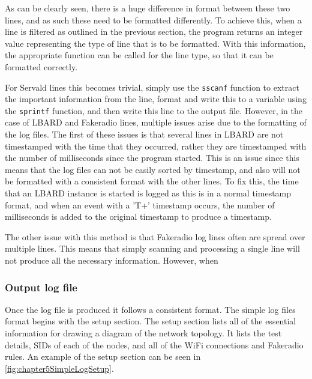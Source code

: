 As can be clearly seen, there is a huge difference in format between these two lines, and as such these need to be formatted differently.
To achieve this, when a line is filtered as outlined in the previous section, the program returns an integer value representing the type of line that is to be formatted.
With this information, the appropriate function can be called for the line type, so that it can be formatted correctly.

For Servald lines this becomes trivial, simply use the \verb|sscanf| function to extract the important information from the line, format and write this to a variable using the \verb|sprintf| function, and then write this line to the output file. 
However, in the case of LBARD and Fakeradio lines, multiple issues arise due to the formatting of the log files.
The first of these issues is that several lines in LBARD are not timestamped with the time that they occurred, rather they are timestamped with the number of milliseconds since the program started.
This is an issue since this means that the log files can not be easily sorted by timestamp, and also will not be formatted with a consistent format with the other lines.
To fix this, the time that an LBARD instance is started is logged as this is in a normal timestamp format, and when an event with a 'T+' timestamp occurs, the number of milliseconds is added to the original timestamp to produce a timestamp. 

The other issue with this method is that Fakeradio log lines often are spread over multiple lines.
This means that simply scanning and processing a single line will not produce all the necessary information.
However, when 

\subsubsection{Output log file}

Once the log file is produced it follows a consistent format.
The simple log files format begins with the setup section.
The setup section lists all of the essential information for drawing a diagram of the network topology. 
It lists the test details, SIDs of each of the nodes, and all of the WiFi connections and Fakeradio rules. 
An example of the setup section can be seen in \figurename{ \ref{fig:chapter5SimpleLogSetup}}.

